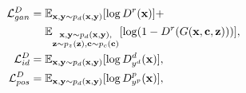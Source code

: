 \documentclass[10pt,journal,compsoc]{IEEEtran}
\begin{document}
\begin{align}
 \mathcal{L}_{gan}^{D}  = {}& \mathbb{E}_{\mathbf{x} ,\mathbf{y} \sim p_{d}(\mathbf{x},\mathbf{y})} [\log D^r({\bf{x}})] + \nonumber \\ 
 {}& \mathbb{E}_{\substack{\mathbf{x} ,\mathbf{y} \sim p_{d}(\mathbf{x},\mathbf{y}), \\ \mathbf{z} \sim p_{z}(\mathbf{z}) , \mathbf{c} \sim p_{c}(\mathbf{c}) }} [\log(1- D^r(G(\mathbf{x}, \mathbf{c}, \mathbf{z}))) ], \\
\mathcal{L}_{id}^{D}  = {} & \mathbb{E}_{\mathbf{x} ,\mathbf{y} \sim p_{d}(\mathbf{x},\mathbf{y})} [\log D^d_{y^d}({\bf{x}})], \\
\mathcal{L}_{pos}^{D}   = {} & \mathbb{E}_{\mathbf{x} ,\mathbf{y} \sim p_{d}(\mathbf{x},\mathbf{y})} [\log D^p_{y^p}({\bf{x}})],
\end{align}%
\end{document}

